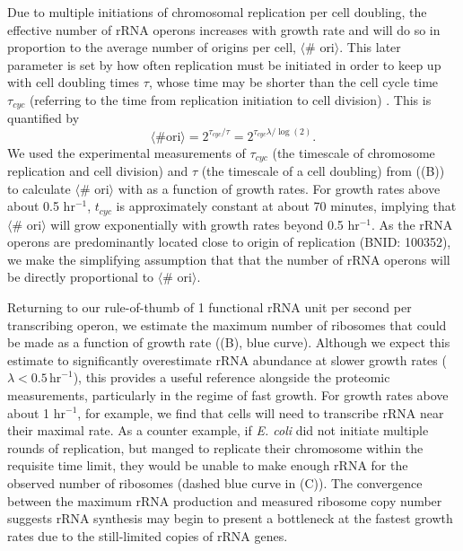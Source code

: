 Due to multiple initiations of chromosomal replication per cell doubling, the
effective number of rRNA operons increases with growth rate and will do so in
proportion to the average number of origins per cell, $\langle$\# ori$\rangle$.
This later parameter is set by how often replication must be initiated in order
to keep up with cell doubling times $\tau$, whose time may be shorter than the
cell cycle time $\tau_{cyc}$ (referring to the time from replication initiation to
cell division) \citep{dennis2004}. This is quantified by
\begin{equation}
    \langle \text{\# ori} \rangle = 2^{\tau_{cyc} / \tau} = 2^{\tau_{cyc} \lambda / \log(2)}.
    \label{eq:Nori}
\end{equation}
We used the experimental measurements of $\tau_{cyc}$ (the timescale of
chromosome replication and cell division) and $\tau$ (the timescale of a cell
doubling) from
\cite{si2017} ((B)) to calculate
$\langle$\# ori$\rangle$  with  as a function of growth rates. For
growth rates above about 0.5 hr$^{-1}$, $t_{cyc}$ is approximately constant at
about 70 minutes, implying that $\langle$\# ori$\rangle$ will grow
exponentially with growth rates beyond 0.5 hr$^{-1}$. As the rRNA operons are predominantly located
close to origin of replication (BNID: 100352), we make the simplifying
assumption that that the number of rRNA operons  will be directly proportional
to $\langle$\# ori$\rangle$.

Returning to our rule-of-thumb of 1 functional rRNA unit per second per
transcribing operon, we estimate the maximum number of ribosomes that could be
made as a function of growth rate ((B), blue curve).
Although we expect this estimate to significantly overestimate rRNA abundance at
slower growth rates ($\lambda < 0.5\, \text{hr}^{-1}$), this provides a useful
reference alongside the proteomic measurements, particularly in the regime of
fast growth. For growth rates above about 1 hr$^{-1}$, for example, we find that
cells will need to transcribe rRNA near their maximal rate. As a counter
example, if \textit{E. coli} did not initiate multiple rounds of replication,
but manged to replicate their chromosome within the requisite time limit, they
would be unable to make enough rRNA for the observed number of ribosomes (dashed
blue curve in (C)). The convergence between the maximum rRNA
production and measured ribosome copy number suggests rRNA synthesis may begin
to present a bottleneck at the fastest growth rates due to the still-limited
copies of rRNA genes.


